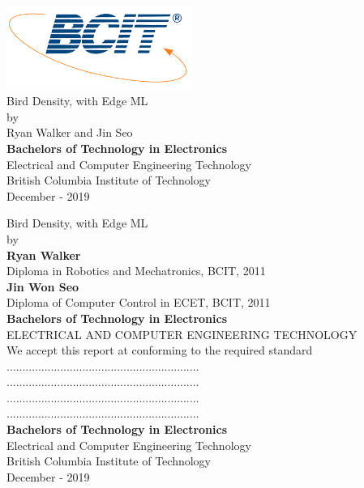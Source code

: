 \documentclass{article}
\begin{document}
\begin{center}
\includegraphics[width=6cm]{img/bcit-logo.png} \\
\huge{Bird Density, with Edge ML} \\
\large{by} \\
\large{Ryan Walker and Jin Seo} \\
\vspace*{\fill}
\large{\textbf{Bachelors of Technology in Electronics}} \\
\large{Electrical and Computer Engineering Technology} \\
\large{British Columbia Institute of Technology} \\
\large{December - 2019} \\
\end{center}
\newpage
\begin{center}
\huge{Bird Density, with Edge ML} \\
\large{by} \\

\large{\textbf{Ryan Walker}} \\
\large{Diploma in Robotics and Mechatronics, BCIT, 2011} \\
 
\large{\textbf{Jin Won Seo}} \\
\large{Diploma of Computer Control in ECET, BCIT, 2011} \\
\vfill
\large{\textbf{Bachelors of Technology in Electronics}} \\
\large{ELECTRICAL AND COMPUTER ENGINEERING TECHNOLOGY} \\

\vfill
\large{We accept this report at conforming to the required standard} \\
\large{.............................................................} \\
\large{.............................................................} \\
\large{.............................................................} \\
\large{.............................................................} \\


\vspace*{\fill}
\large{\textbf{Bachelors of Technology in Electronics}} \\
\large{Electrical and Computer Engineering Technology} \\
\large{British Columbia Institute of Technology} \\
\large{December - 2019} \\
\end{center}
\newpage
\end{document}
